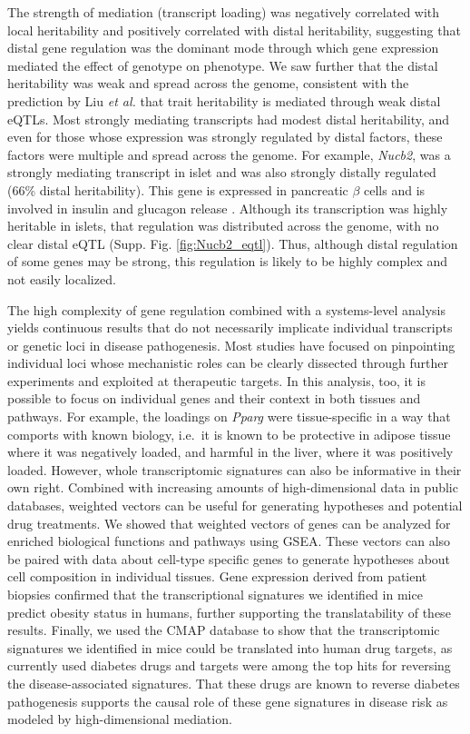 \documentclass[
]{article}
\begin{document}
The strength of mediation (transcript loading) was negatively correlated
with local heritability and positively correlated with distal
heritability, suggesting that distal gene regulation was the dominant
mode through which gene expression mediated the effect of genotype on
phenotype. We saw further that the distal heritability was weak and
spread across the genome, consistent with the prediction by Liu
\textit{et al.} \cite{pmid31051098} that trait heritability is mediated
through weak distal eQTLs. Most strongly mediating transcripts had
modest distal heritability, and even for those whose expression was
strongly regulated by distal factors, these factors were multiple and
spread across the genome. For example, \textit{Nucb2}, was a strongly
mediating transcript in islet and was also strongly distally regulated
(66\% distal heritability). This gene is expressed in pancreatic
\(\beta\) cells and is involved in insulin and glucagon release
\cite{pmid22108805, pmid23537085, 
pmid24993278}. Although its transcription was highly heritable in
islets, that regulation was distributed across the genome, with no clear
distal eQTL (Supp. Fig. \ref{fig:Nucb2_eqtl}). Thus, although distal
regulation of some genes may be strong, this regulation is likely to be
highly complex and not easily localized.

The high complexity of gene regulation combined with a systems-level
analysis yields continuous results that do not necessarily implicate
individual transcripts or genetic loci in disease pathogenesis. Most
studies have focused on pinpointing individual loci whose mechanistic
roles can be clearly dissected through further experiments and exploited
at therapeutic targets. In this analysis, too, it is possible to focus
on individual genes and their context in both tissues and pathways. For
example, the loadings on \textit{Pparg} were tissue-specific in a way
that comports with known biology, i.e.~it is known to be protective in
adipose tissue where it was negatively loaded, and harmful in the liver,
where it was positively loaded. However, whole transcriptomic signatures
can also be informative in their own right. Combined with increasing
amounts of high-dimensional data in public databases, weighted vectors
can be useful for generating hypotheses and potential drug treatments.
We showed that weighted vectors of genes can be analyzed for enriched
biological functions and pathways using GSEA. These vectors can also be
paired with data about cell-type specific genes to generate hypotheses
about cell composition in individual tissues. Gene expression derived
from patient biopsies confirmed that the transcriptional signatures we
identified in mice predict obesity status in humans, further supporting
the translatability of these results. Finally, we used the CMAP database
to show that the transcriptomic signatures we identified in mice could
be translated into human drug targets, as currently used diabetes drugs
and targets were among the top hits for reversing the disease-associated
signatures. That these drugs are known to reverse diabetes pathogenesis
supports the causal role of these gene signatures in disease risk as
modeled by high-dimensional mediation.
\end{document}
